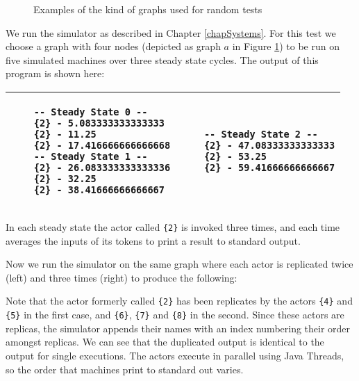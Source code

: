 \begin{figure}
\begin{center}
	
\caption{Examples of the kind of graphs used for random tests}
\label{figRGraph}
\end{center}
\end{figure}

We run the simulator as described in Chapter \ref{chapSystems}.
For this test we choose a graph with four nodes (depicted as graph $a$ in Figure \ref{figRGraph}) to be run on five simulated machines over three steady state cycles.
The output of this program is shown here:

\begin{center}
\begin{tabular}{ | p{5cm} p{5cm} | }
	\hline
	\begin{verbatim}
	-- Steady State 0 --
	{2} - 5.083333333333333
	{2} - 11.25
	{2} - 17.416666666666668
	-- Steady State 1 --
	{2} - 26.083333333333336
	{2} - 32.25
	{2} - 38.41666666666667
	\end{verbatim}
	&
	\begin{verbatim}
	-- Steady State 2 --
	{2} - 47.08333333333333
	{2} - 53.25
	{2} - 59.41666666666667
	\end{verbatim}
	\\ \hline
\end{tabular}
\end{center}

\noindent In each steady state the actor called \verb={2}= is invoked three times, and each time averages the inputs of its tokens to print a result to standard output.

Now we run the simulator on the same graph where each actor is replicated twice (left) and three times (right) to produce the following:

\noindent Note that the actor formerly called \verb={2}= has been replicates by the actors \verb={4}= and \verb={5}= in the first case, and \verb={6}=, \verb={7}= and \verb={8}= in the second.
Since these actors are replicas, the simulator appends their names with an index numbering their order amongst replicas.
We can see that the duplicated output is identical to the output for single executions.
The actors execute in parallel using Java Threads, so the order that machines print to standard out varies.

